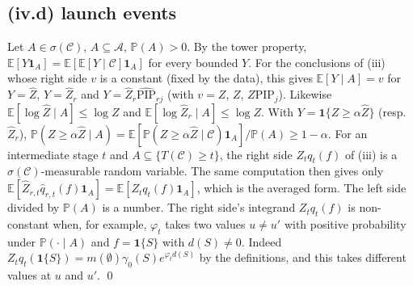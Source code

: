 \documentclass[11pt]{article}
\theoremstyle{remark}
\newcommand{\E}{\mathbb{E}}
\renewcommand{\P}{\mathbb{P}}
\newcommand{\cC}{\mathcal{C}}
\newcommand{\cA}{\mathcal{A}}
\newcommand{\Zh}{\widehat Z}
\newcommand{\qh}{\widehat q}
\newcommand{\PIPh}{\widehat{\mathrm{PIP}}}
\newcommand{\PIP}{\mathrm{PIP}}
\newcommand{\ind}{\mathbf 1}
\begin{document}
\subsection{(iv.d) launch events}
Let $A\in\sigma(\cC)$, $A\subseteq\cA$, $\P(A)>0$. By the tower property, $\E[Y\ind_A]=\E[\E[Y\mid\cC]\ind_A]$ for every bounded $Y$. For the conclusions of (iii) whose right side $v$ is a constant (fixed by the data), this gives $\E[Y\mid A]=v$ for $Y=\Zh$, $Y=\Zh_r$ and $Y=\Zh_r\PIPh_{rj}$ (with $v=Z$, $Z$, $Z\PIP_j$). Likewise $\E[\log\Zh\mid A]\le\log Z$ and $\E[\log\Zh_r\mid A]\le\log Z$. With $Y=\ind\{Z\ge\alpha\Zh\}$ (resp.\ $\Zh_r$), $\P(Z\ge\alpha\Zh\mid A)=\E[\P(Z\ge\alpha\Zh\mid\cC)\ind_A]/\P(A)\ge1-\alpha$. For an intermediate stage $t$ and $A\subseteq\{T(\cC)\ge t\}$, the right side $Z_tq_t(f)$ of (iii) is a $\sigma(\cC)$-measurable random variable. The same computation then gives only $\E[\Zh_{r,t}\qh_{r,t}(f)\ind_A]=\E[Z_tq_t(f)\ind_A]$, which is the averaged form. The left side divided by $\P(A)$ is a number. The right side's integrand $Z_tq_t(f)$ is non-constant when, for example, $\varphi_t$ takes two values $u\ne u'$ with positive probability under $\P(\cdot\mid A)$ and $f=\ind\{S\}$ with $d(S)\ne0$. Indeed $Z_tq_t(\ind\{S\})=m(\emptyset)\gamma_0(S)e^{\varphi_td(S)}$ by the definitions, and this takes different values at $u$ and $u'$. \qed
\end{document}

